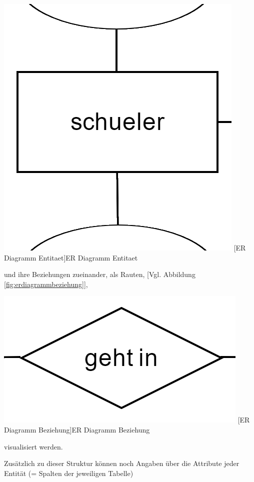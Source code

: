 \documentclass[12pt,a4paper,bibliography=totocnumbered,listof=totocnumbered]{scrartcl}
\begin{document}
\begin{minipage}{\linewidth}
\vspace{1em}
\begin{minipage}{\linewidth}
	\centering
	\includegraphics[width=0.6\linewidth]{Bilder/erd-entitaet.png}
	[ER Diagramm Entitaet]{ER Diagramm Entitaet}
	\label{fig:erdiagrammentitaet}
\end{minipage}

und ihre Beziehungen zueinander, als Rauten, [Vgl. Abbildung \ref{fig:erdiagrammbeziehung}],

\vspace{1em}
\begin{minipage}{\linewidth}
	\centering
	\includegraphics[width=0.7\linewidth]{Bilder/erd-beziehung.png}
	[ER Diagramm Beziehung]{ER Diagramm Beziehung}
	\label{fig:erdiagrammbeziehung}
\end{minipage}

visualisiert werden.

Zusätzlich zu dieser Struktur können noch Angaben über die Attribute jeder Entität (= Spalten der jeweiligen Tabelle)


\end{minipage}
\end{document}
